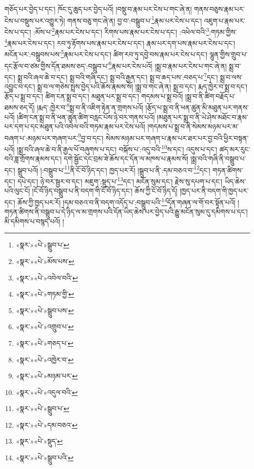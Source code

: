 གཅོད་པར་བྱེད་པ་དང་། ཁོང་དུ་ཆུད་པར་བྱེད་པའོ། །བསྡུ་བ་རྣམ་པར་ངེས་པ་གང་ཞེ་ན། གནས་བཅུས་རྣམ་པར་ངེས་པ་བསྡུས་པར་འགྱུར་ཏེ། གནས་བཅུ་གང་ཞེ་ན། བྱ་བ་:བསྒྲུབ་པ་\footnote{«སྣར་»«པེ་»སྒྲུབ་པ་}རྣམ་པར་ངེས་པ་དང་། འཇུག་པ་རྣམ་པར་ངེས་པ་དང་། :མོས་པ་\footnote{«སྣར་»«པེ་»མོས་པས་}རྣམ་པར་ངེས་པ་དང་། རིགས་པས་རྣམ་པར་ངེས་པ་དང་། :འཕེལ་བའི་\footnote{«སྣར་»«པེ་»འབེལ་བའི་}:གཏམ་གྱིས་\footnote{«སྣར་»«པེ་»གཏམ་གྱི་}རྣམ་པར་ངེས་པ་དང་། རབ་ཏུ་རྟོགས་པས་རྣམ་པར་ངེས་པ་དང་། རྣམ་པར་དག་པས་རྣམ་པར་ངེས་པ་དང་། མངོན་པར་:བསྒྲུབས་པས་\footnote{«སྣར་»«པེ་»སྒྲུབ་པས་}རྣམ་པར་ངེས་པ་དང་། ཚིག་རབ་ཏུ་དབྱེ་བས་རྣམ་པར་ངེས་པ་དང་། ལྷུན་གྱིས་གྲུབ་པ་དང་རྩོལ་བ་ཙམ་གྱིས་དོན་ཐམས་ཅད་:བསྒྲུབ་པ་\footnote{«སྣར་»«པེ་»འགྲུབ་པ་}རྣམ་པར་ངེས་པའོ། །སྨྲ་བ་རྣམ་པར་ངེས་པ་གང་ཞེ་ན། སྨྲ་བ་དང་། སྨྲ་བའི་ཞལ་ཆེ་བ་དང་། སྨྲ་བའི་གཞི་དང་། སྨྲ་བའི་རྒྱན་དང་། སྨྲ་བ་ཆད་པས་:བཅད་པ་\footnote{«སྣར་»«པེ་»གཅད་པ་}དང་། སྨྲ་བ་ལས་འབྱུང་བ་དང་། སྨྲ་བ་ལ་གཅེས་སྤྲས་བྱེད་པའི་ཆོས་རྣམས་སོ། །སྨྲ་བ་གང་ཞེ་ན། སྨྲ་བ་དང་། རྨད་ཁྱེར་བ་སྨྲ་བ་དང་། རྩོད་པ་སྨྲ་བ་དང་། ཚིག་ངན་སྨྲ་བ་དང་། མཐུན་པར་སྨྲ་བ་དང་། གདམས་པ་སྨྲ་བའོ། །སྨྲ་བ་ནི་ཚིག་བརྗོད་པ་ཐམས་ཅད་དོ། །རྨད་:ཁྱེར་བ་\footnote{«སྣར་»«པེ་»འཁྱེར་བ་}སྨྲ་བ་ནི་འཇིག་རྟེན་ན་གྲགས་པའོ། །རྩོད་པ་སྨྲ་བ་ནི་ཕན་ཚུན་མི་མཐུན་པར་གནས་པའོ། །ཚིག་ངན་སྨྲ་བ་ནི་ཕན་ཚུན་ཚིག་བརླང་པོས་ཉེ་བར་གནས་པའོ། །མཐུན་པར་སྨྲ་བ་ནི་ཡེ་ཤེས་མཐོང་བ་རྣམ་པར་དག་པ་དང་མཐུན་པའི་འབེལ་བའི་གཏམ་རྣམ་པར་ངེས་པའོ། །གདམས་པ་སྨྲ་བ་ནི་སེམས་མཉམ་པར་མ་བཞག་པ་:མཉམ་པར་གཞག་པར་\footnote{«སྣར་»«པེ་»མཉམ་པར་}བྱ་བ་དང་། སེམས་མཉམ་པར་གཞག་པ་རྣམ་པར་ཐར་པར་བྱ་བའི་ཕྱིར་བསྟན་པའོ། །སྨྲ་བའི་ཞལ་ཆེ་བ་ནི་རྒྱལ་པོ་བཞུགས་པ་དང་། བསྐོས་པ་:འདུ་བའི་\footnote{«སྣར་»«པེ་»འདུལ་བའི་}ས་དང་། འདུས་པ་དང་། ཚད་མར་རུང་བའི་ཟླ་གྲོགས་རྣམས་དང་། དགེ་སྦྱོང་དང་བྲམ་ཟེ་ཆོས་དང་དོན་ལ་མཁས་པ་རྣམས་སོ། །སྨྲ་བའི་གཞི་ནི་བསྒྲུབ་པ་དང་། སྒྲུབ་པའོ། །:བསྒྲུབ་པ་\footnote{«སྣར་»«པེ་»སྒྲུབ་པ་}ནི་ངོ་བོ་ཉིད་དང་། ཁྱད་པར་རོ། །སྒྲུབ་པ་ནི་:དམ་བཅའ་བ་\footnote{«སྣར་»«པེ་»དམ་བཅའ་}དང་། གཏན་ཚིགས་དང་། དཔེ་དང་། ཉེ་བར་སྦྱར་བ་དང་། མཇུག་:སྡུད་པ་\footnote{«སྣར་»«པེ་»སྡུད་}དང་། མངོན་སུམ་དང་། རྗེས་སུ་དཔག་པ་དང་། ཡིད་ཆེས་པའི་ལུང་ངོ། །ངོ་བོ་ཉིད་བསྒྲུབ་པ་ནི་བདག་གི་ངོ་བོ་ཉིད་དང་། ཆོས་ཀྱི་ངོ་བོ་ཉིད་དོ། །ཁྱད་པར་ནི་བདག་གི་ཁྱད་པར་དང་། ཆོས་ཀྱི་ཁྱད་པར་རོ། །དམ་བཅའ་བ་ནི་བདག་འདོད་པ་:བསྒྲུབ་པའི་\footnote{«སྣར་»«པེ་»སྒྲུབ་པའི་}དོན་གཞན་ལ་གོ་བར་སྟོན་པའོ། །གཏན་ཚིགས་ནི་བསྒྲུབ་པ་དེ་ཉིད་ལ་མ་གྲགས་པའི་དོན་ཡིད་ཆེས་པར་བྱེད་པའི་རྒྱུ་མངོན་སུམ་དུ་དམིགས་པ་དང་། མི་དམིགས་པ་བསྙད་པའོ། །
